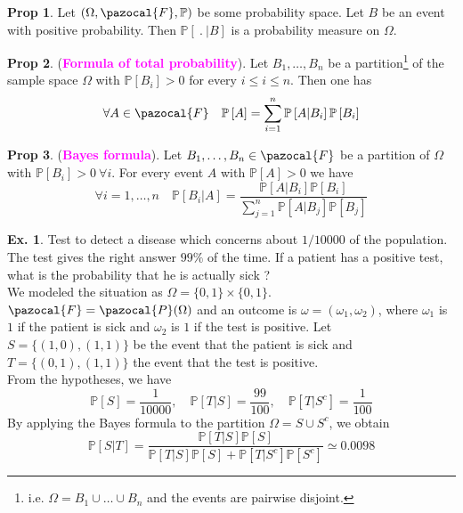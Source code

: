 \documentclass[8pt,a4paper,landscape]{article}
\theoremstyle{definition}
\theoremstyle{example}
\newtheorem{example}{Ex.}[section]
\theoremstyle{intuition}
\theoremstyle{definition}
\newtheorem{proposition}{Prop}[section]
\newcommand{\Fb}{\pazocal{F}}
\newcommand{\Pb}{\pazocal{P}}
\newcommand{\mydef}[1]{\textcolor{magenta}{\textbf{#1}}}
\newcommand{\prob}[1]{\mathbb{P}\left[ #1 \right]}
\begin{document}
\begin{multicols}{3}
				\begin{proposition}
					Let $(\Omega, \Fb, \mathbb{P})$ be some probability space. Let $B$ be an event with positive probability. Then $\prob{\ . \ \lvert B}$ is a probability measure on $\Omega$.
				\end{proposition}
				
				\begin{proposition}
					(\mydef{Formula of total probability}). Let $B_1, \ldots, B_n$ be a partition\footnote{i.e. $\Omega = B_1 \cup \ldots \cup B_n$ and the events are pairwise disjoint.} of the sample space $\Omega$ with $\prob{B_i} > 0$ for every $i \leq i \leq n$. Then one has
					$$
						\forall A \in \Fb \quad \prob{A} = \sum_{i=1}^n \prob{A \lvert B_i} \prob{B_i}
					$$
				\end{proposition}
				
				\begin{proposition}
					(\mydef{Bayes formula}). Let $B_1, \ldots, B_n \in \Fb$ be a partition of $\Omega$ with $\prob{B_i} > 0 \ \forall i$. For every event $A$ with $\prob{A} > 0$ we have 
					$$
						\forall i = 1, \ldots, n \quad \prob{B_i \lvert A} = \frac{\prob{A \vert B_i} \prob{B_i}}{\sum_{j=1}^n \prob{A \lvert B_j} \prob{B_j}}
					$$
				\end{proposition}
				
				\begin{example}
					Test to detect a disease which concerns about $1/10000$ of the population. The test gives the right answer $99\%$ of the time. If a patient has a positive test, what is the probability that he is actually sick ?\\
					We modeled the situation as $\Omega = \{0,1\} \times \{0,1\}$. $\Fb = \Pb(\Omega)$ and an outcome is $\omega = (\omega_1, \omega_2)$, where $\omega_1$ is $1$ if the patient is sick and $\omega_2$ is $1$ if the test is positive. Let $S = \{(1,0), (1,1)\}$ be the event that the patient is sick and $T = \{(0,1),(1,1)\}$ the event that the test is positive.\\
					From the hypotheses, we have
					$$
						\prob{S} = \frac{1}{10000}, \quad \prob{T \lvert S} = \frac{99}{100}, \quad \prob{T \lvert S^c} = \frac{1}{100}
					$$
					By applying the Bayes formula to the partition $\Omega = S \cup S^c$, we obtain
					$$
						\prob{S \lvert T} = \frac{\prob{T \lvert S} \prob{S}}{\prob{T \lvert S} \prob{S} + \prob{T \lvert S^c} \prob{S^c}} \simeq 0.0098
					$$
				\end{example}
				

\end{multicols}
\end{document}
